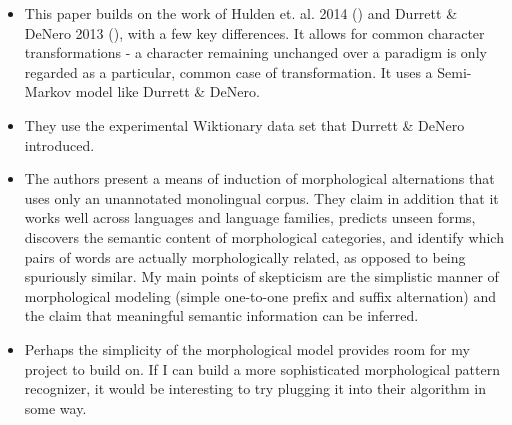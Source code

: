 \documentclass[12pt]{report}
\begin{document}
\begin{itemize}
	
	\item This paper builds on the work of Hulden et. al. 2014 (\cite{Hulden2014}) and Durrett \& DeNero 2013 (\cite{Durrett2013}), with a few key differences. It allows for common character transformations - a character remaining unchanged over a paradigm is only regarded as a particular, common case of transformation. It uses a Semi-Markov model like Durrett \& DeNero.
	
	\item They use the experimental Wiktionary data set that Durrett \& DeNero introduced.
	
\end{itemize}


\begin{itemize}

	\item The authors present a means of induction of morphological alternations that uses only an unannotated monolingual corpus. They claim in addition that it works well across languages and language families, predicts unseen forms, discovers the semantic content of morphological categories, and identify which pairs of words are actually morphologically related, as opposed to being spuriously similar. My main points of skepticism are the simplistic manner of morphological modeling (simple one-to-one prefix and suffix alternation) and the claim that meaningful semantic information can be inferred.
	
	\item Perhaps the simplicity of the morphological model provides room for my project to build on. If I can build a more sophisticated morphological pattern recognizer, it would be interesting to try plugging it into their algorithm in some way.

\end{itemize}

\end{document}

